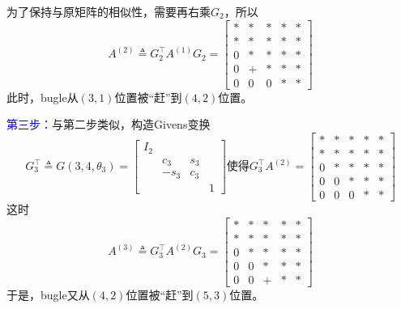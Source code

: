\documentclass[12pt,a4paper]{article}
\begin{document}
为了保持与原矩阵的相似性，需要再右乘$G_2$，所以$$
A^{(2)} \triangleq G_{2}^{\top} A^{(1)} G_{2}=\left[\begin{array}{ccccc}{*} & {*} & {*} & {*}& {*}\\ {*} & {*} & {*} & {*}& {*}\\ {0} & {*} & {*}& {*}& {*} \\ {0} & {+} & {*} & {*}& {*}\\ {0} & {0} & {0} & {*}& {*}\end{array}\right]
$$
此时，bugle从$(3,1)$位置被“赶”到$(4,2)$位置。

\textcolor{blue}{第三步：}\quad 与第二步类似，构造Givens变换$$
G_{3}^{\top} \triangleq G\left(3,4, \theta_{3}\right)=\left[\begin{array}{cccc}{I_{2}} & {} & {}& {} \\ {} & {c_{3}} & {s_{3}} & {}\\ {} & {-s_{3}}& { c_{3}} & {}\\ {} & {}& {} & {1}\end{array}\right]
\text{使得}G_{3}^{\top} A^{(2)}=\left[\begin{array}{ccccc}{*} & {*} & {*} & {*}& {*}\\ {*} & {*} & {*} & {*} & {*}\\ {0} & {*} & {*} & {*}& {*} \\ {0} & {0} & {*} & {*}& {*} \\ {0} & {0} & {0} & {*}& {*}\end{array}\right]
$$这时$$
A^{(3)} \triangleq G_{3}^{\top} A^{(2)} G_{3}=\left[\begin{array}{ccccc}{*} & {*} & {*} & {*}& {*}\\ {*} & {*} & {*} & {*}& {*}\\ {0} & {*} & {*}& {*}& {*} \\ {0} & {0} & {*} & {*}& {*}\\ {0} & {0} & {+} & {*}& {*}\end{array}\right]
$$
于是，bugle又从$(4,2)$位置被“赶”到$(5,3)$位置。
\end{document}
